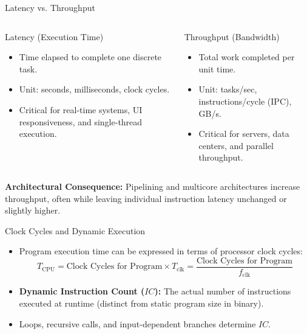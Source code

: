 \documentclass[aspectratio=169,11pt]{beamer}
\newcommand{\key}[1]{\textbf{#1}}
\begin{document}
\begin{frame}{Latency vs. Throughput}

\begin{columns}[T,onlytextwidth]

\begin{block}{Latency (Execution Time)}
\begin{itemize}
  \item Time elapsed to complete one discrete task.
  \item Unit: seconds, milliseconds, clock cycles.
  \item Critical for real-time systems, UI responsiveness, and single-thread execution.
\end{itemize}
\end{block}

\begin{block}{Throughput (Bandwidth)}
\begin{itemize}
  \item Total work completed per unit time.
  \item Unit: tasks/sec, instructions/cycle (IPC), GB/s.
  \item Critical for servers, data centers, and parallel throughput.
\end{itemize}
\end{block}

\end{columns}

\vspace{0.6em}
\key{Architectural Consequence:} Pipelining and multicore architectures increase throughput, often while leaving individual instruction latency unchanged or slightly higher.

\end{frame}


\begin{frame}{Clock Cycles and Dynamic Execution}

\begin{itemize}
  \item Program execution time can be expressed in terms of processor clock cycles:
  $$T_{\text{CPU}} = \text{Clock Cycles for Program} \times T_{\text{clk}} = \frac{\text{Clock Cycles for Program}}{f_{\text{clk}}}$$
  \item \key{Dynamic Instruction Count ($\mathit{IC}$):} The actual number of instructions executed at runtime (distinct from static program size in binary).
  \item Loops, recursive calls, and input-dependent branches determine $\mathit{IC}$.
\end{itemize}

\end{frame}
\end{document}
